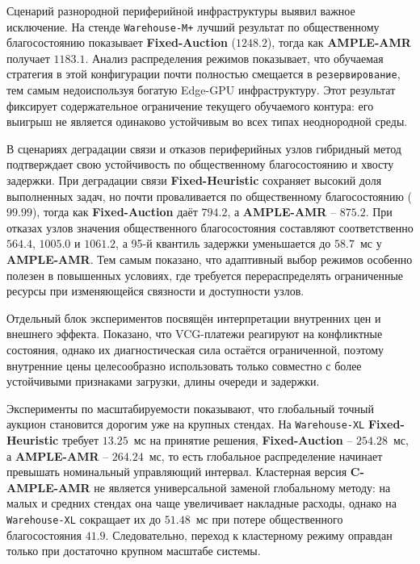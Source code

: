 Сценарий разнородной периферийной инфраструктуры выявил важное исключение.
На стенде \texttt{Warehouse-M+} лучший результат по общественному
благосостоянию показывает \textbf{Fixed-Auction} ($1248.2$), тогда как
\textbf{AMPLE-AMR} получает $1183.1$. Анализ распределения режимов показывает,
что обучаемая стратегия в этой конфигурации почти полностью смещается в
\texttt{резервирование}, тем самым недоиспользуя богатую Edge-GPU инфраструктуру.
Этот результат фиксирует содержательное ограничение текущего обучаемого
контура: его выигрыш не является одинаково устойчивым во всех типах
неоднородной среды.

В сценариях деградации связи и отказов периферийных узлов гибридный метод
подтверждает свою устойчивость по общественному благосостоянию и хвосту
задержки. При деградации связи \textbf{Fixed-Heuristic} сохраняет высокий
доля выполненных задач, но почти проваливается по общественному благосостоянию
($99.99$), тогда как \textbf{Fixed-Auction} даёт $794.2$, а
\textbf{AMPLE-AMR} -- $875.2$. При отказах узлов значения общественного
благосостояния составляют соответственно $564.4$, $1005.0$ и $1061.2$, а
95-й квантиль задержки уменьшается до $58.7$~мс у \textbf{AMPLE-AMR}. Тем
самым показано, что адаптивный выбор режимов особенно полезен в повышенных
условиях, где требуется перераспределять ограниченные ресурсы при изменяющейся
связности и доступности узлов.

Отдельный блок экспериментов посвящён интерпретации внутренних цен и внешнего
эффекта. Показано, что VCG-платежи реагируют на конфликтные состояния, однако
их диагностическая сила остаётся ограниченной, поэтому внутренние цены
целесообразно использовать только совместно с более устойчивыми признаками
загрузки, длины очереди и задержки.

Эксперименты по масштабируемости показывают, что глобальный точный аукцион
становится дорогим уже на крупных стендах. На \texttt{Warehouse-XL}
\textbf{Fixed-Heuristic} требует $13.25$~мс на принятие решения,
\textbf{Fixed-Auction} -- $254.28$~мс, а \textbf{AMPLE-AMR} -- $264.24$~мс,
то есть глобальное распределение начинает превышать номинальный управляющий
интервал. Кластерная версия \textbf{C-AMPLE-AMR} не является универсальной заменой
глобальному методу: на малых и средних стендах она чаще увеличивает накладные
расходы, однако на \texttt{Warehouse-XL} сокращает их до $51.48$~мс при потере
общественного благосостояния $41.9$. Следовательно, переход к кластерному
режиму оправдан только при достаточно крупном масштабе системы.

